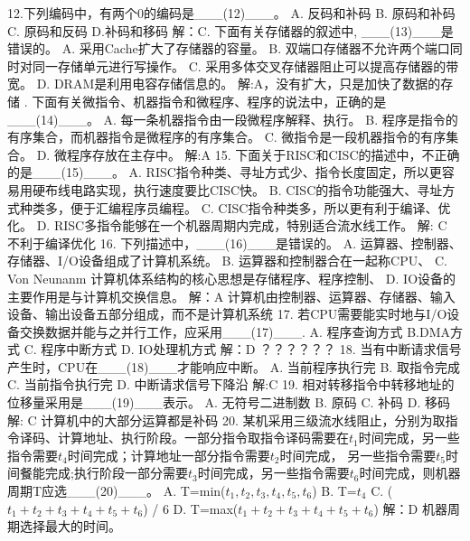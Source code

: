 12.下列编码中，有两个0的编码是\_\_\_(12)\_\_\_。
A. 反码和补码  B. 原码和补码  C.  原码和反码  D.补码和移码
解：C. 下面有关存储器的叙述中, \_\_\_(13)\_\_\_是错误的。
A. 采用Cache扩大了存储器的容量。
B. 双端口存储器不允许两个端口同时对同一存储单元进行写操作。
C. 采用多体交叉存储器阻止可以提高存储器的带宽。
D. DRAM是利用电容存储信息的。
解:A，没有扩大，只是加快了数据的存储 . 下面有关微指令、机器指令和微程序、程序的说法中，正确的是\_\_\_(14)\_\_\_。
A. 每一条机器指令由一段微程序解释、执行。
B. 程序是指令的有序集合，而机器指令是微程序的有序集合。
C. 微指令是一段机器指令的有序集合。
D. 微程序存放在主存中。
解:A  
15. 下面关于RISC和CISC的描述中，不正确的是\_\_\_(15)\_\_\_。
A. RISC指令种类、寻址方式少、指令长度固定，所以更容易用硬布线电路实现，执行速度要比CISC快。
B. CISC的指令功能强大、寻址方式种类多，便于汇编程序员编程。
C. CISC指令种类多，所以更有利于编译、优化。
D. RISC多指令能够在一个机器周期内完成，特别适合流水线工作。
解: C  不利于编译优化
16. 下列描述中，\_\_\_(16)\_\_\_是错误的。
A. 运算器、控制器、存储器、I/O设备组成了计算机系统。
B. 运算器和控制器合在一起称CPU、
C. Von Neunanm 计算机体系结构的核心思想是存储程序、程序控制、
D. IO设备的主要作用是与计算机交换信息。
解：A 计算机由控制器、运算器、存储器、输入设备、输出设备五部分组成，而不是计算机系统
17. 若CPU需要能实时地与I/O设备交换数据并能与之并行工作，应采用\_\_\_(17)\_\_\_.
A. 程序查询方式     B.DMA方式   C. 程序中断方式     D. IO处理机方式
解：D ？？？？？？
18. 当有中断请求信号产生时，CPU在\_\_\_(18)\_\_\_才能响应中断。
A. 当前程序执行完      B. 取指令完成   C. 当前指令执行完  D. 中断请求信号下降沿
解:C
19. 相对转移指令中转移地址的位移量采用是\_\_\_(19)\_\_\_表示。
A. 无符号二进制数   B. 原码  C. 补码  D. 移码
解: C 计算机中的大部分运算都是补码
20. 某机采用三级流水线阻止，分别为取指令译码、计算地址、执行阶段。一部分指令取指令译码需要在$t_1$时间完成，另一些指令需要$t_4$时间完成；计算地址一部分指令需要$t_2$时间完成， 另一些指令需要$t_5$时间餐能完成;执行阶段一部分需要$t_3$时间完成，另一些指令需要$t_6$时间完成，则机器周期T应选\_\_\_(20)\_\_\_。
A. T=min($t_1,t_2,t_3,t_4,t_5,t_6$)   B. T=$t_4$    
C. ($t_1+t_2+t_3+t_4+t_5+t_6$) / 6  D. T=max($t_1+t_2+t_3+t_4+t_5+t_6$)
解：D 机器周期选择最大的时间。


